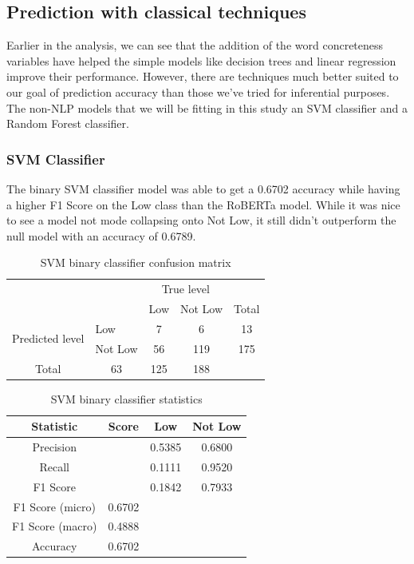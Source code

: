 \documentclass[12pt, a4paper]{article}
\begin{document}
\subsection{Prediction with classical techniques}
Earlier in the analysis, we can see that the addition of the word concreteness variables have helped the simple models like decision trees and linear regression improve their performance. However, there are techniques much better suited to our goal of prediction accuracy than those we've tried for inferential purposes. The non-NLP models that we will be fitting in this study an SVM classifier and a Random Forest classifier.

\subsubsection{SVM Classifier}

The binary SVM classifier model was able to get a 0.6702 accuracy while having a higher F1 Score on the Low class than the RoBERTa model. While it was nice to see a model not mode collapsing onto Not Low, it still didn't outperform the null model with an accuracy of 0.6789. 

\begin{table}[ht]
\centering
\begin{tabular}{l|l|c|c|c}
\multicolumn{2}{c}{}&\multicolumn{2}{c}{True level}&\\
\cline{3-4}
\multicolumn{2}{c|}{}&Low&Not Low&\multicolumn{1}{c}{Total}\\
\cline{2-4}
\multirow{2}{*}{Predicted level}& Low & 7 & 6 & 13\\
\cline{2-4}
& Not Low & 56 & 119 & 175\\
\cline{2-4}
\multicolumn{1}{c}{Total} & \multicolumn{1}{c}{63} & \multicolumn{    1}{c}{125} & \multicolumn{1}{c}{188}\\
\end{tabular}
\caption{SVM binary classifier confusion matrix}
\label{table:svmcm_low}
\end{table}

\begin{table}[ht]
\centering
\begin{tabular}{||c c c c||} 
 \hline
 Statistic & Score & Low & Not Low  \\ [0.5ex] 
 \hline\hline
 Precision &  & 0.5385 & 0.6800 \\ 
 Recall & & 0.1111 & 0.9520 \\
 F1 Score &  & 0.1842 & 0.7933 \\
 F1 Score (micro) & 0.6702 & & \\
 F1 Score (macro)  & 0.4888 & &  \\ 
 Accuracy  & 0.6702 & & \\ [1ex] 
 \hline
\end{tabular}
\caption{SVM binary classifier statistics}
\label{table:svmstat_low}
\end{table}
\end{document}
